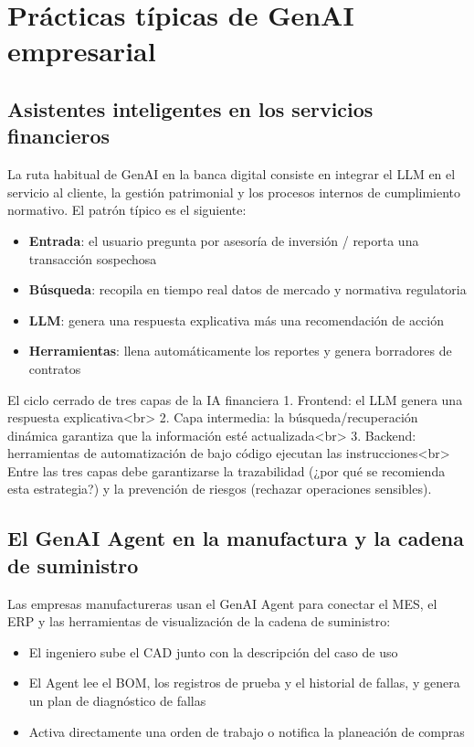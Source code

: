\section{Prácticas típicas de GenAI empresarial}

\subsection{Asistentes inteligentes en los servicios financieros}

La ruta habitual de GenAI en la banca digital consiste en integrar el LLM en el servicio al cliente, la gestión patrimonial y los procesos internos de cumplimiento normativo. El patrón típico es el siguiente:

\begin{itemize}
    \item \textbf{Entrada}: el usuario pregunta por asesoría de inversión / reporta una transacción sospechosa
    \item \textbf{Búsqueda}: recopila en tiempo real datos de mercado y normativa regulatoria
    \item \textbf{LLM}: genera una respuesta explicativa más una recomendación de acción
    \item \textbf{Herramientas}: llena automáticamente los reportes y genera borradores de contratos
\end{itemize}

\begin{knowledgebox}{El ciclo cerrado de tres capas de la IA financiera}
1. Frontend: el LLM genera una respuesta explicativa<br>
2. Capa intermedia: la búsqueda/recuperación dinámica garantiza que la información esté actualizada<br>
3. Backend: herramientas de automatización de bajo código ejecutan las instrucciones<br>
Entre las tres capas debe garantizarse la trazabilidad (¿por qué se recomienda esta estrategia?) y la prevención de riesgos (rechazar operaciones sensibles).
\end{knowledgebox}

\subsection{El GenAI Agent en la manufactura y la cadena de suministro}

Las empresas manufactureras usan el GenAI Agent para conectar el MES, el ERP y las herramientas de visualización de la cadena de suministro:

\begin{itemize}
    \item El ingeniero sube el CAD junto con la descripción del caso de uso
    \item El Agent lee el BOM, los registros de prueba y el historial de fallas, y genera un plan de diagnóstico de fallas
    \item Activa directamente una orden de trabajo o notifica la planeación de compras
\end{itemize}

